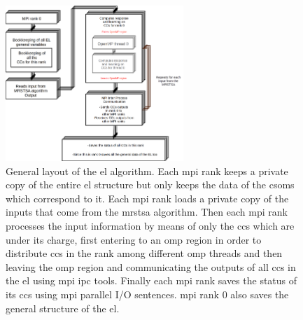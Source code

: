 \documentclass[11pt,a4paper]{article}
\begin{document}
\begin{figure}[h!]
    \centering
    \includegraphics[width=0.6\textwidth]{EL_ALG.png}
    \caption{General layout of the \gls{el} algorithm. Each \gls{mpi} rank keeps a private copy of the entire \gls{el} structure but only keeps the data of the \glspl{csom} which correspond to it. Each \gls{mpi} rank loads a private copy of the inputs that come from the \gls{mrstsa} algorithm. Then each \gls{mpi} rank processes the input information by means of only the \glspl{cc} which are under its charge, first entering to an \gls{omp} region in order to distribute \glspl{cc} in the rank among different \gls{omp} threads and then leaving the \gls{omp} region and communicating the outputs of all \glspl{cc} in the \gls{el} using \gls{mpi} \gls{ipc} tools. Finally each \gls{mpi} rank saves the status of its \glspl{cc} using \gls{mpi} parallel I/O sentences. \gls{mpi} rank 0 also saves the general structure of the \gls{el}.} 
    \label{fig:EL_ALG}
\end{figure}
\end{document}
